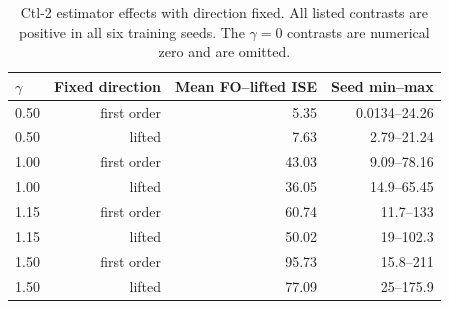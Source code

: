 \begin{table}[t]
\centering
\small
\begin{tabular}{@{}lrrr@{}}
\toprule
$\gamma$ & Fixed direction & Mean FO--lifted ISE & Seed min--max \\
\midrule
0.50 & first order & 5.35 & 0.0134--24.26 \\
0.50 & lifted & 7.63 & 2.79--21.24 \\
1.00 & first order & 43.03 & 9.09--78.16 \\
1.00 & lifted & 36.05 & 14.9--65.45 \\
1.15 & first order & 60.74 & 11.7--133 \\
1.15 & lifted & 50.02 & 19--102.3 \\
1.50 & first order & 95.73 & 15.8--211 \\
1.50 & lifted & 77.09 & 25--175.9 \\
\bottomrule
\end{tabular}
\caption{Ctl-2 estimator effects with direction fixed. All listed contrasts are positive in all six training seeds. The $\gamma=0$ contrasts are numerical zero and are omitted.}
\label{tab:ctl2-factorial}
\end{table}

